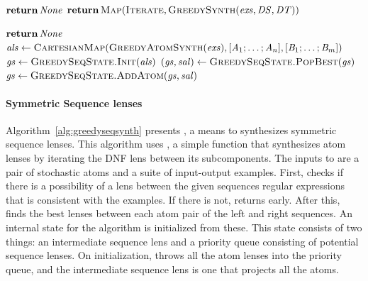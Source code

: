 \documentclass[acmsmall,screen,anonymous]{acmart}
\begin{document}
\begin{algorithm}
  \caption{\GreedySeqSynth}
  \label{alg:greedyseqsynth}
  \begin{algorithmic}[1]
    \State $\ReturnVal{\None}$
    \Else
    \State $\ReturnVal{\Call{Map}{\PCF{Iterate},\GreedySynth(\Examples,\DNFRegex,\DNFRegexAlt)}}$
    \EndIf
    \EndFunction

    \State $\ReturnVal{\None}$
    \EndIf
    \State $\ALS \gets
    \Call{\CartesianMap}{\AtomSynth(\Examples),\ListOf{\Atom_1;\ldots;\Atom_n},\ListOf{\AtomAlt_1;\ldots;\AtomAlt_m}}$
    \State $\GreedyState \gets \Call{GreedySeqState.Init}{\ALS}$
    \State $(\GreedyState,\SAtomLens) \gets
    \Call{GreedySeqState.PopBest}{\GreedyState}$
    \State $\GreedyState \gets \Call{GreedySeqState.AddAtom}{\GreedyState,\SAtomLens}$
    \EndIf
    \EndWhile
    \EndFunction
  \end{algorithmic}
\end{algorithm}

\paragraph*{Symmetric Sequence lenses} Algorithm~\ref{alg:greedyseqsynth}
presents \GreedySeqSynth, a means to synthesizes symmetric sequence lenses. This
algorithm uses , a simple function that synthesizes atom lenses
by iterating the DNF lens between its subcomponents. The inputs to
\GreedySeqSynth are a pair of stochastic atoms and a suite of input-output
examples. First,  checks if there is a possibility of a lens
between the given sequences regular expressions that is consistent with the
examples. If there is not, \GreedySeqSynth returns \None early. After this,
\GreedySeqSynth finds the best lenses between each atom pair of the left and
right sequences. An internal state for the algorithm is initialized from these.
This state consists of two things: an intermediate sequence lens and a priority
queue consisting of potential sequence lenses. On initialization,
\GreedySeqSynth throws all the atom lenses into the priority queue, and the
intermediate sequence lens is one that projects all the atoms.
\end{document}
